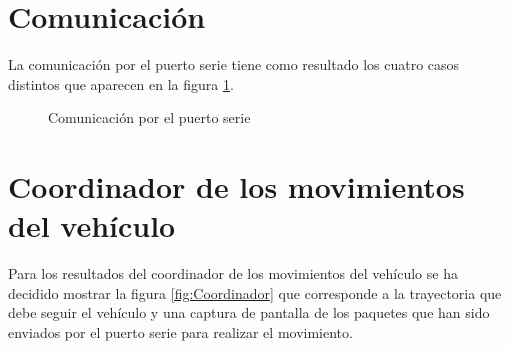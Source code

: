 \section{Comunicación}

La comunicación por el puerto serie tiene como resultado los cuatro casos distintos que aparecen en la figura \ref{fig:ComunicacionRes}.

\begin{figure}[htbp]
 \centering
 \caption{Comunicación por el puerto serie}
 \label{fig:ComunicacionRes}
\end{figure}

\section{Coordinador de los movimientos del vehículo}

Para los resultados del coordinador de los movimientos del vehículo se ha decidido mostrar la figura \ref{fig:Coordinador} que corresponde a la trayectoria que debe seguir el vehículo y una captura de pantalla de los paquetes que han sido enviados por el puerto serie para realizar el movimiento.

